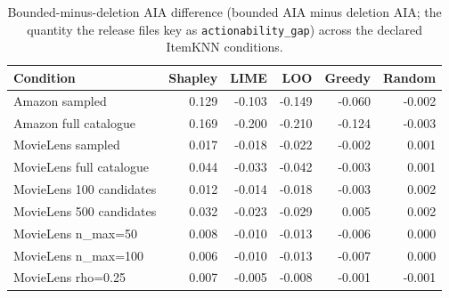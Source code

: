 \begin{table}[t]\centering\scriptsize
\caption{Bounded-minus-deletion AIA difference (bounded AIA minus deletion AIA; the quantity the release files key as \texttt{actionability\_gap}) across the declared ItemKNN conditions.}
\label{tab:appC4}
\begin{tabular}{lrrrrr}
\toprule
Condition & Shapley & LIME & LOO & Greedy & Random \\
\midrule
Amazon sampled & 0.129 & -0.103 & -0.149 & -0.060 & -0.002 \\
Amazon full catalogue & 0.169 & -0.200 & -0.210 & -0.124 & -0.003 \\
MovieLens sampled & 0.017 & -0.018 & -0.022 & -0.002 & 0.001 \\
MovieLens full catalogue & 0.044 & -0.033 & -0.042 & -0.003 & 0.001 \\
MovieLens 100 candidates & 0.012 & -0.014 & -0.018 & -0.003 & 0.002 \\
MovieLens 500 candidates & 0.032 & -0.023 & -0.029 & 0.005 & 0.002 \\
MovieLens n_max=50 & 0.008 & -0.010 & -0.013 & -0.006 & 0.000 \\
MovieLens n_max=100 & 0.006 & -0.010 & -0.013 & -0.007 & 0.000 \\
MovieLens rho=0.25 & 0.007 & -0.005 & -0.008 & -0.001 & -0.001 \\
\bottomrule
\end{tabular}
\end{table}